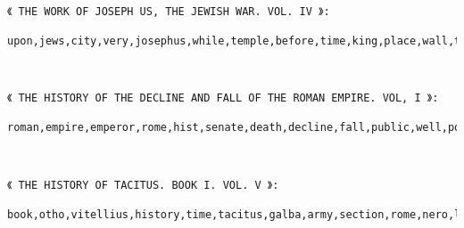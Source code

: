\documentclass[11pt]{article}
\begin{document}
    \begin{center}
    \end{center}
    { \hspace*{\fill} \\}
    
    \begin{Verbatim}[commandchars=\\\{\}]
《 THE WORK OF JOSEPH US, THE JEWISH WAR. VOL. IV 》:
 upon,jews,city,very,josephus,while,temple,before,time,king,place,wall,titus,come,jerusalem,vespasian,country,together,away,army

    \end{Verbatim}

    \begin{center}
    \end{center}
    { \hspace*{\fill} \\}
    
    \begin{Verbatim}[commandchars=\\\{\}]
《 THE HISTORY OF THE DECLINE AND FALL OF THE ROMAN EMPIRE. VOL, I 》:
 roman,empire,emperor,rome,hist,senate,death,decline,fall,public,well,power,time,life,general,august,ancient,army,reign,part

    \end{Verbatim}

    \begin{center}
    \end{center}
    { \hspace*{\fill} \\}
    
    \begin{Verbatim}[commandchars=\\\{\}]
《 THE HISTORY OF TACITUS. BOOK I. VOL. V 》:
 book,otho,vitellius,history,time,tacitus,galba,army,section,rome,nero,legion,emperor,public,city,whole,vespasian,enemy,camp,prince

    \end{Verbatim}

    \begin{center}
    \end{center}
    { \hspace*{\fill} \\}
    
\end{document}
